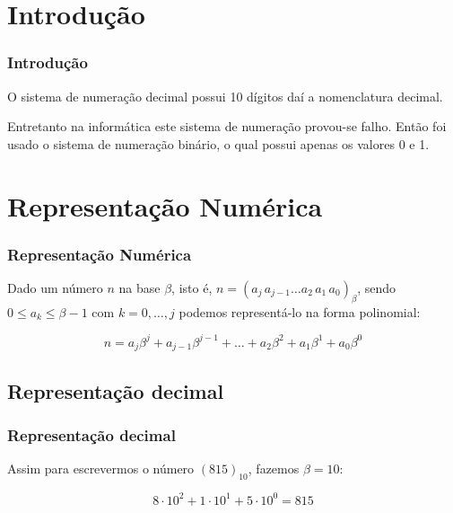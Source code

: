 \begin{frame}\frametitle{}


\end{frame}

\section{Introdução}

\begin{frame}\frametitle{Introdução}

O sistema de numeração decimal possui 10 dígitos daí a nomenclatura
decimal.

Entretanto na informática este sistema de numeração provou-se falho.
Então foi usado o sistema de numeração binário, o qual possui apenas os
valores 0 e 1.

\end{frame}

\begin{frame}\frametitle{}


\end{frame}

\section{Representação Numérica}

\begin{frame}\frametitle{Representação Numérica}

Dado um número $n$ na base $\beta$, isto é,
$n = (a_j \, a_{j-1} \dots a_2 \, a_1 \, a_0)_\beta$, sendo
$0 \le a_k \le \beta-1$ com $k = 0, \dots, j$ podemos representá-lo na
forma polinomial:

\begin{equation}
n = a_j \beta^j + a_{j-1} \beta^{j-1} + \dots + a_2 \beta^2 + a_1 \beta^1 + a_0 \beta^0
\end{equation}

\end{frame}

\subsection{Representação decimal}

\begin{frame}\frametitle{Representação decimal}

Assim para escrevermos o número $(815)_{10}$, fazemos $\beta = 10$:

\begin{equation}
8 \cdot 10^2 + 1 \cdot 10^1 + 5 \cdot 10^0 = 815
\end{equation}

\end{frame}

